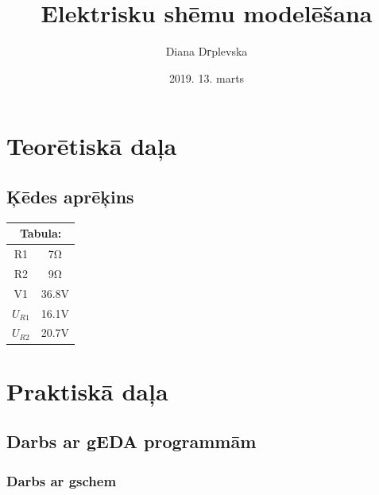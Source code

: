 \documentclass {report}
\title{Elektrisku shēmu modelēšana}
\author{Diana Dгplevska}
\date{2019. 13. marts}
\begin{document}
\maketitle
\chapter{Teorētiskā daļa}
\section{Ķēdes aprēķins}

\begin{center}
\small\addtolength{\tabcolsep}{10pt}
\begin{tabular}{|c|c|}
    \hline \multicolumn{2}{|c|}{Tabula:} \\
\hline
R1 & 7Ω\\
\hline
R2 & 9Ω\\
\hline
V1 & 36.8V\\
\hline
$U_{R1}$ & 16.1V\\
\hline
$U_{R2}$ & 20.7V\\
\hline
\end{tabular}
\end{center}
\chapter{Praktiskā daļa}
\section{Darbs ar gEDA programmām}
\subsection{Darbs ar gschem}
\\
\end{document}
